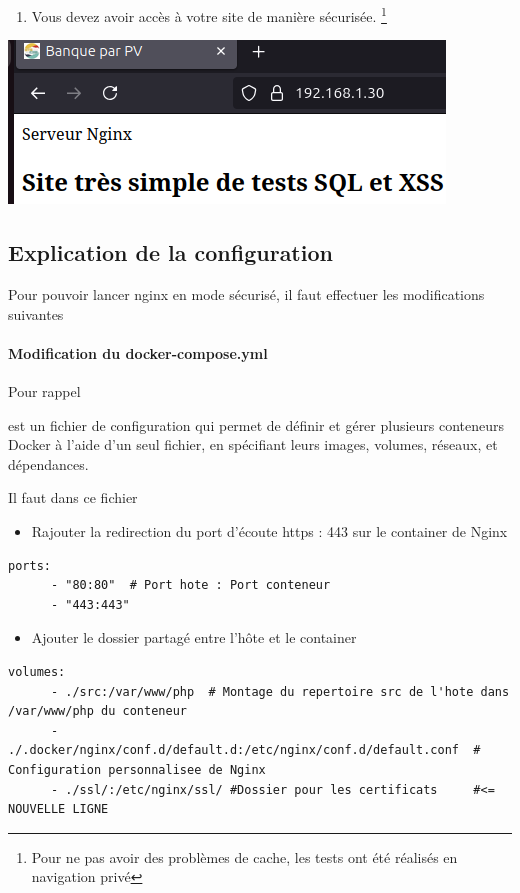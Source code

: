 \documentclass[french, 12pt]{article}%
\newcommand{\itemE}{\item[$\bullet$]}
\newcommand{\titreencadre}{Titre}
\newenvironment{encadre}[1]{\renewcommand{\titreencadre}{#1}
	\begin{mdframed}[style=encadrestyle]
	\vspace{0.5\baselineskip}
	}{%
	\end{mdframed}}
\begin{document}
\begin{enumerate}[resume]
\item Vous devez avoir accès à votre site de manière sécurisée. \footnote{Pour ne pas avoir des problèmes de cache, les tests ont été réalisés en navigation privé}
\end{enumerate}

\begin{center}
\includegraphics[scale=0.7]{./ressource/nginxHttps}
\end{center}

\subsection{Explication de la configuration}
Pour pouvoir lancer nginx en mode sécurisé, il faut effectuer les modifications suivantes  

\paragraph{Modification du docker-compose.yml}

Pour rappel  
\begin{encadre}{Un fichier \verb?docker-compose.yml?}
 est un fichier de configuration qui permet de définir et gérer plusieurs conteneurs Docker à l’aide d’un seul fichier, en spécifiant leurs images, volumes, réseaux, et dépendances.
\end{encadre}

Il faut dans ce fichier

\begin{itemize}
\itemE Rajouter la redirection du port d'écoute https : 443 sur le container de Nginx 
\end{itemize}

\begin{lstlisting}[style=commande]
ports:
      - "80:80"  # Port hote : Port conteneur
      - "443:443"
\end{lstlisting}

\begin{itemize}
\itemE Ajouter le dossier partagé entre l'hôte et le container
\end{itemize}
\begin{lstlisting}[style=commande]
volumes:
      - ./src:/var/www/php  # Montage du repertoire src de l'hote dans /var/www/php du conteneur
      - ./.docker/nginx/conf.d/default.d:/etc/nginx/conf.d/default.conf  # Configuration personnalisee de Nginx
      - ./ssl/:/etc/nginx/ssl/ #Dossier pour les certificats     #<= NOUVELLE LIGNE
\end{lstlisting}
\end{document}
